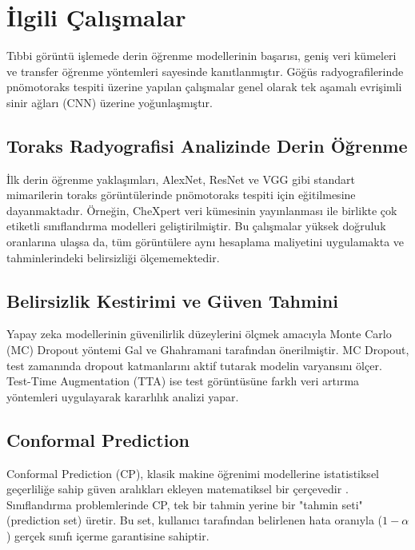\chapter{İlgili Çalışmalar}
\label{ch:ilgili_calismalar}

Tıbbi görüntü işlemede derin öğrenme modellerinin başarısı, geniş veri kümeleri ve transfer öğrenme yöntemleri sayesinde kanıtlanmıştır. Göğüs radyografilerinde pnömotoraks tespiti üzerine yapılan çalışmalar genel olarak tek aşamalı evrişimli sinir ağları (CNN) üzerine yoğunlaşmıştır.

\section{Toraks Radyografisi Analizinde Derin Öğrenme}
İlk derin öğrenme yaklaşımları, AlexNet, ResNet ve VGG gibi standart mimarilerin toraks görüntülerinde pnömotoraks tespiti için eğitilmesine dayanmaktadır. Örneğin, CheXpert \cite{irvin2019chexpert} veri kümesinin yayınlanması ile birlikte çok etiketli sınıflandırma modelleri geliştirilmiştir. Bu çalışmalar yüksek doğruluk oranlarına ulaşsa da, tüm görüntülere aynı hesaplama maliyetini uygulamakta ve tahminlerindeki belirsizliği ölçememektedir.

\section{Belirsizlik Kestirimi ve Güven Tahmini}
Yapay zeka modellerinin güvenilirlik düzeylerini ölçmek amacıyla Monte Carlo (MC) Dropout yöntemi Gal ve Ghahramani \cite{gal2016dropout} tarafından önerilmiştir. MC Dropout, test zamanında dropout katmanlarını aktif tutarak modelin varyansını ölçer. Test-Time Augmentation (TTA) ise test görüntüsüne farklı veri artırma yöntemleri uygulayarak kararlılık analizi yapar.

\section{Conformal Prediction}
Conformal Prediction (CP), klasik makine öğrenimi modellerine istatistiksel geçerliliğe sahip güven aralıkları ekleyen matematiksel bir çerçevedir \cite{shafer2008tutorial}. Sınıflandırma problemlerinde CP, tek bir tahmin yerine bir "tahmin seti" (prediction set) üretir. Bu set, kullanıcı tarafından belirlenen hata oranıyla ($1 - \alpha$) gerçek sınıfı içerme garantisine sahiptir.
